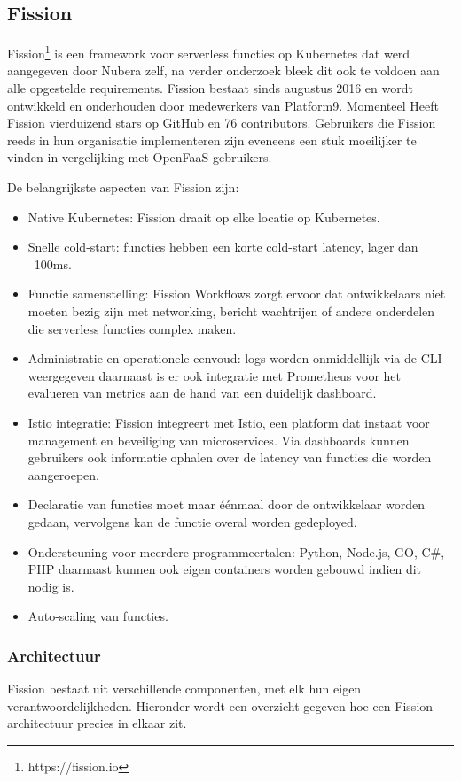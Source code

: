 \subsection{Fission}
Fission\footnote{https://fission.io} is een framework voor serverless functies op Kubernetes dat werd aangegeven door Nubera zelf, na verder onderzoek bleek dit ook te voldoen aan alle opgestelde requirements. Fission bestaat sinds augustus 2016 en wordt ontwikkeld en onderhouden door medewerkers van Platform9. Momenteel Heeft Fission vierduizend stars op GitHub en 76 contributors. Gebruikers die Fission reeds in hun organisatie implementeren zijn eveneens een stuk moeilijker te vinden in vergelijking met OpenFaaS gebruikers.

De  belangrijkste aspecten van Fission zijn:
\begin{itemize}
    \item Native Kubernetes: Fission draait op elke locatie op Kubernetes.
    \item Snelle cold-start: functies hebben een korte cold-start latency, lager dan ~100ms.
    \item Functie samenstelling: Fission Workflows zorgt ervoor dat ontwikkelaars niet moeten bezig zijn met networking, bericht wachtrijen of andere onderdelen die serverless functies complex maken.
    \item Administratie en operationele eenvoud: logs worden onmiddellijk via de CLI weergegeven daarnaast is er ook integratie met Prometheus voor het evalueren van metrics aan de hand van een duidelijk dashboard.
    \item Istio integratie: Fission integreert met Istio, een platform dat instaat voor management en beveiliging van microservices. Via dashboards kunnen gebruikers ook informatie ophalen over de latency van functies die worden aangeroepen.
    \item Declaratie van functies moet maar éénmaal door de ontwikkelaar worden gedaan, vervolgens kan de functie overal worden gedeployed.
    \item Ondersteuning voor meerdere programmeertalen: Python, Node.js, GO, C\#, PHP daarnaast kunnen ook eigen containers worden gebouwd indien dit nodig is. 
    \item Auto-scaling van functies. 
\end{itemize}

\subsubsection{Architectuur}
Fission bestaat uit verschillende componenten, met elk hun eigen verantwoordelijkheden. Hieronder wordt een overzicht gegeven hoe een Fission architectuur precies in elkaar zit. 

